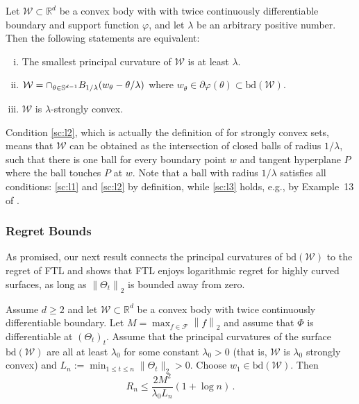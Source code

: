\documentclass[english]{article}
\newcommand{\cW}{\mathcal{W}}
\newcommand{\cF}{\mathcal{F}}
\newcommand{\R}{\mathbb{R}}
\newcommand{\bS}{\mathbb{S}}
\newcommand{\norm}[1]{\left\| #1 \right\|}
\newcommand{\bd}{\mathrm{bd}}
\begin{document}
\begin{proposition}
	\label{prop:strongconvex}
	Let $\cW \subset \R^d$ be a convex body with with twice continuously differentiable boundary and support function $\varphi$, 
	and let $\lambda$ be an arbitrary positive number.
	Then the following statements are equivalent:
	\begin{enumerate}[(i)]
		\item \label{sc:l1} The smallest principal curvature of $\cW$ is at least $\lambda$.
		\item \label{sc:l2} $\cW= {\large \cap}_{\theta \in \bS^{d-1} }{B_{1/\lambda} (w_\theta- \theta /\lambda)}$ where $w_\theta \in \partial \varphi(\theta) \subset \bd(\cW)$.
		\item \label{sc:l3} $\cW$ is $\lambda$-strongly convex.
	\end{enumerate}
\end{proposition}
Condition \eqref{sc:l2}, which is actually the definition of \citet{Pol96} for strongly convex sets, means that $\cW$ can be obtained as the intersection of closed balls of radius $1/\lambda$, such that there is one ball for every boundary point $w$ and  tangent hyperplane $P$ where the ball touches $P$ at $w$. Note that a ball with radius $1/\lambda$ satisfies all conditions: \eqref{sc:l1} and \eqref{sc:l2} by definition, while \eqref{sc:l3} holds, e.g., by Example~13 of \citet{JourneeNRS10}.


\subsubsection{Regret Bounds}


As promised, our next result connects the principal curvatures of $\bd(\cW)$ to the regret of FTL
and shows that FTL enjoys logarithmic regret for highly curved surfaces, as long as $\norm{\Theta_t}_2$ 
is bounded away from zero.
\begin{theorem}
\label{thm:R_curvesurface}
Assume $d \ge 2$ and let $\cW\subset \R^d$ be a convex body with twice continuously differentiable boundary.
Let $M = \max_{f\in \cF} \norm{f}_2$ and assume that $\Phi$ is differentiable at $(\Theta_t)_{t}$.
Assume that the principal curvatures of the surface $\bd(\cW)$ 
are all at least $\lambda_0$ for some constant $\lambda_0>0$ (that is, $\cW$ is $\lambda_0$ strongly convex) and $L_n:=\min_{1\le t \le n} \|\Theta_t\|_2 >0$. 
Choose $w_1\in \bd(\cW)$.
Then
\[
R_n \le \frac{2M^2}{\lambda_0 L_n}(1+ \log n)\,.
\]
\end{theorem}
\end{document}
